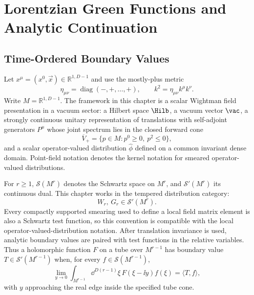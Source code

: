 \chapter{Lorentzian Green Functions and Analytic Continuation}
\label{ch:lorentzian-green-functions}
\ConventionsMixed


\section{Time-Ordered Boundary Values}

\begin{definition}
\label{def:lorentzian-scalar-vacuum-sector-datum}
Let \(x^\mu=(x^0,\vec x)\in\mathbb R^{1,D-1}\) and use the mostly-plus
metric
\[
  \eta_{\mu\nu}=\operatorname{diag}(-,+,\ldots,+),
  \qquad
  k^2=\eta_{\mu\nu}k^\mu k^\nu.
\]
Write \(M=\mathbb R^{1,D-1}\).  The framework in this chapter is a scalar
Wightman field presentation in a vacuum sector: a Hilbert space \(\Hilb\), a
vacuum vector \(\vac\), a strongly continuous unitary representation of
translations with self-adjoint generators \(P^\mu\) whose joint spectrum lies
in the closed forward cone
\[
  \overline V_+=\{p\in M:p^0\ge0,\ p^2\le0\},
\]
and a scalar
operator-valued distribution \(\widehat\phi\) defined on a common invariant
dense domain.  Point-field notation denotes the kernel notation for smeared
operator-valued distributions.

For \(r\ge1\), \(\mathcal S(M^r)\) denotes the Schwartz space on \(M^r\), and
\(\mathcal S'(M^r)\) its continuous dual.  This chapter works in the tempered
distribution category:
\[
  W_r,\ G_r\in\mathcal S'(M^r).
\]
Every compactly supported smearing used to define a local field matrix element
is also a Schwartz test function, so this convention is compatible with the
local operator-valued-distribution notation.  After translation invariance is
used, analytic boundary values are paired with test functions in the relative
variables.  Thus a holomorphic function \(F\) on a tube over \(M^{r-1}\) has
boundary value \(T\in\mathcal S'(M^{r-1})\) when, for every
\(f\in\mathcal S(M^{r-1})\),
\[
  \lim_{y\to0}
  \int_{M^{r-1}}\dd^{D(r-1)}\xi\,
  F(\xi-\ii y)f(\xi)
  =
  \langle T,f\rangle ,
\]
with \(y\) approaching the real edge inside the specified tube cone.
\end{definition}

